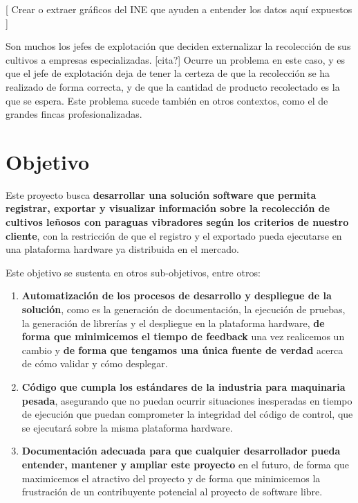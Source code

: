 [ Crear o extraer gráficos del INE que ayuden a entender los datos aquí expuestos ]

Son muchos los jefes de explotación que deciden externalizar la recolección
de sus cultivos a empresas especializadas. [cita?] Ocurre un problema en este
caso, y es que el jefe de explotación deja de tener la certeza de que la
recolección se ha realizado de forma correcta, y de que la cantidad de producto
recolectado es la que se espera. Este problema sucede también en otros
contextos, como el de grandes fincas profesionalizadas.


\section{Objetivo}

Este proyecto busca \textbf{desarrollar una solución software que permita
registrar, exportar y visualizar información sobre la recolección de cultivos
leñosos con paraguas vibradores según los criterios de nuestro cliente},
con la restricción de que el registro y el exportado pueda ejecutarse en
una plataforma hardware ya distribuida en el mercado.

Este objetivo se sustenta en otros sub-objetivos, entre otros:

\begin{enumerate}
    \item \textbf{Automatización de los procesos de desarrollo y despliegue de la solución}, como es
    la generación de documentación, la ejecución de pruebas, la generación de librerías
    y el despliegue en la plataforma hardware, \textbf{de forma que minimicemos el tiempo de feedback}
    una vez realicemos un cambio y \textbf{de forma que tengamos una única fuente de verdad} acerca de cómo
    validar y cómo desplegar.
    \item \textbf{Código que cumpla los estándares de la industria para maquinaria pesada},
    asegurando que no puedan ocurrir situaciones inesperadas en tiempo de ejecución que puedan
    comprometer la integridad del código de control, que se ejecutará sobre la misma plataforma
    hardware.
    \item \textbf{Documentación adecuada para que cualquier desarrollador pueda entender,
    mantener y ampliar este proyecto} en el futuro, de forma que maximicemos el atractivo
    del proyecto y de forma que minimicemos la frustración de un contribuyente potencial
    al proyecto de software libre.
\end{enumerate}

